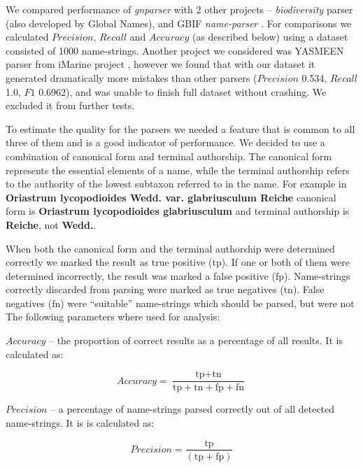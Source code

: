 \documentclass{bmcart}
\begin{document}
We compared performance of \textit{gnparser} with 2 other projects --
\textit{biodiversity} parser \cite{Boyle2013, biodiversity} (also developed by Global
Names), and GBIF \textit{name-parser} \cite{gbifNameParser}. For comparisons we
calculated $Precision$, $Recall$ and $Accuracy$ (as described below) using a
dataset consisted of 1000 name-strings. Another project we considered was
YASMEEN parser from iMarine project \cite{VandenBerghe2015}, however we found
that with our dataset it generated dramatically more mistakes than other
parsers ($Precision$ 0.534, $Recall$ 1.0, $F1$ 0.6962), and was unable to finish
full dataset without crashing. We excluded it from further tests.

To estimate the quality for the parsers we needed a feature that is common to all three of them and is a good indicator of performance.  We decided to
use a combination of canonical form and terminal authorship.  The canonical form
represents the essential elements of a name, while the terminal authorship
refers to the authority of the lowest subtaxon  referred to in the
name. For example in \textbf{Oriastrum lycopodioides Wedd.  var.  glabriusculum
Reiche} canonical form is \textbf{Oriastrum lycopodioides glabriusculum} and
terminal authorship is \textbf{Reiche}, not \textbf{Wedd.}.  

When both the canonical form and the terminal authorship were determined
correctly we marked the result as true positive ($\text{tp}$).  If one or both
of them were determined incorrectly, the result was marked a false positive
($\text{fp}$). Name-strings correctly discarded from parsing were marked as
true negatives ($\text{tn}$). False negatives ($\text{fn}$) were ``suitable''
name-strings which should be parsed, but were not The
following parameters where used for analysis:

$Accuracy$ -- the proportion of correct results as a percentage of  all results.
It is calculated as:

\[Accuracy = \dfrac{\text{tp} + \text{tn}}
  {\text{tp} + \text{tn} + \text{fp} + \text{fn}}\]

$Precision$ -- a percentage of name-strings parsed correctly out of all
detected name-strings. It is is calculated as:

\[Precision = \dfrac{\text{tp}}{(\text{tp} + \text{fp})}\]
\end{document}
